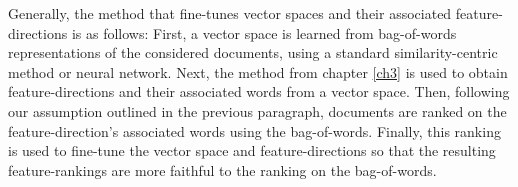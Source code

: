 Generally, the method that fine-tunes vector spaces and their associated feature-directions is as follows: First, a vector space is learned from bag-of-words representations of the considered documents, using a standard similarity-centric method or neural network. Next, the method from chapter \ref{ch3} is used to  obtain feature-directions and their associated words from a vector space. Then, following our assumption outlined in the previous paragraph,  documents are ranked on the feature-direction's associated words using the bag-of-words. Finally, this ranking is used to fine-tune the vector space and feature-directions so that the resulting feature-rankings are more faithful to the ranking on the bag-of-words.









